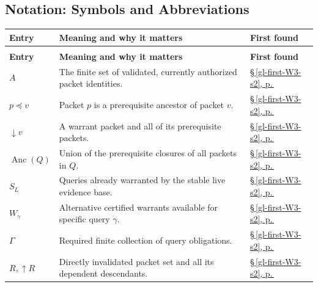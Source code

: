 \documentclass[11pt,letterpaper]{article}
\begin{document}
\subsection*{Notation: Symbols and Abbreviations}
\begingroup\small\setlength{\tabcolsep}{4pt}\renewcommand{\arraystretch}{1.16}
\begin{longtable}{@{}>{\raggedright\arraybackslash}p{.215\linewidth}>{\raggedright\arraybackslash}p{.585\linewidth}>{\raggedright\arraybackslash}p{.14\linewidth}@{}}
\toprule
\textbf{Entry} & \textbf{Meaning and why it matters} & \textbf{First found} \\
\midrule\endfirsthead
\multicolumn{3}{@{}l}{\footnotesize \emph{Notation: Symbols and Abbreviations (continued)}}\\
\toprule\textbf{Entry} & \textbf{Meaning and why it matters} & \textbf{First found} \\
\midrule\endhead
\bottomrule\endfoot
\textbf{$A$} & The finite set of validated, currently authorized packet identities. & \hyperref[gl-first-W3-s2]{\S\,\ref*{gl-first-W3-s2}, p.\,\pageref*{gl-first-W3-s2}} \\
\textbf{$p\preceq v$} & Packet $p$ is a prerequisite ancestor of packet $v$. & \hyperref[gl-first-W3-s2]{\S\,\ref*{gl-first-W3-s2}, p.\,\pageref*{gl-first-W3-s2}} \\
\textbf{$\downarrow v$} & A warrant packet and all of its prerequisite packets. & \hyperref[gl-first-W3-s2]{\S\,\ref*{gl-first-W3-s2}, p.\,\pageref*{gl-first-W3-s2}} \\
\textbf{$\operatorname{Anc}(Q)$} & Union of the prerequisite closures of all packets in $Q$. & \hyperref[gl-first-W3-s2]{\S\,\ref*{gl-first-W3-s2}, p.\,\pageref*{gl-first-W3-s2}} \\
\textbf{$S_L$} & Queries already warranted by the stable live evidence base. & \hyperref[gl-first-W3-s2]{\S\,\ref*{gl-first-W3-s2}, p.\,\pageref*{gl-first-W3-s2}} \\
\textbf{$W_\gamma$} & Alternative certified warrants available for specific query $\gamma$. & \hyperref[gl-first-W3-s2]{\S\,\ref*{gl-first-W3-s2}, p.\,\pageref*{gl-first-W3-s2}} \\
\textbf{$\Gamma$} & Required finite collection of query obligations. & \hyperref[gl-first-W3-s2]{\S\,\ref*{gl-first-W3-s2}, p.\,\pageref*{gl-first-W3-s2}} \\
\textbf{$R,\uparrow R$} & Directly invalidated packet set and all its dependent descendants. & \hyperref[gl-first-W3-s2]{\S\,\ref*{gl-first-W3-s2}, p.\,\pageref*{gl-first-W3-s2}} \\

\end{longtable}
\end{document}
